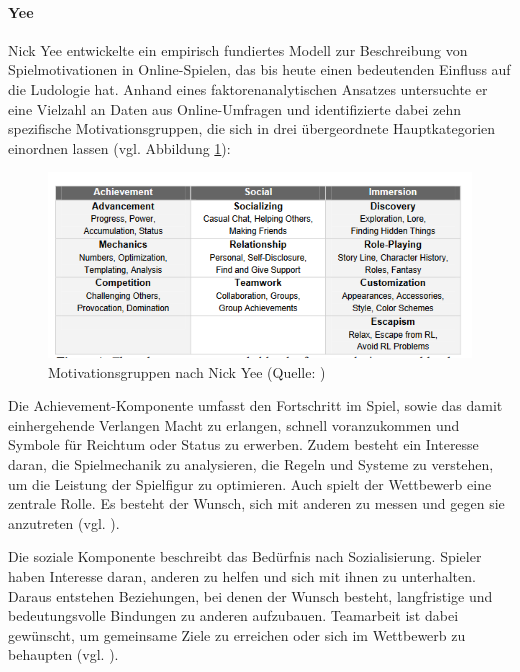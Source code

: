 \paragraph{Yee}
Nick Yee entwickelte ein empirisch fundiertes Modell zur Beschreibung von Spielmotivationen in Online-Spielen, das bis heute einen bedeutenden Einfluss auf die Ludologie hat. Anhand eines faktorenanalytischen Ansatzes untersuchte er eine Vielzahl an Daten aus Online-Umfragen und identifizierte dabei zehn spezifische Motivationsgruppen, die sich in drei übergeordnete Hauptkategorien einordnen lassen (vgl. Abbildung \ref{fig:nick_yee_motivations}):

\begin{figure}[ht]
\centering
\includegraphics[width=1\linewidth]{content/pictures/nick_yee_categorizations.PNG}
\caption{Motivationsgruppen nach Nick Yee (Quelle: \citealp[S. 5]{nick_yee_motivations_2006})}
\label{fig:nick_yee_motivations}
\end{figure}

Die Achievement-Komponente umfasst den Fortschritt im Spiel, sowie das damit einhergehende Verlangen Macht zu erlangen, schnell voranzukommen und Symbole für Reichtum oder Status zu erwerben. Zudem besteht ein Interesse daran, die Spielmechanik zu analysieren, die Regeln und Systeme zu verstehen, um die Leistung der Spielfigur zu optimieren. Auch spielt der Wettbewerb eine zentrale Rolle. Es besteht der Wunsch, sich mit anderen zu messen und gegen sie anzutreten (vgl. \citealp[S. 5]{nick_yee_motivations_2006}).

Die soziale Komponente beschreibt das Bedürfnis nach Sozialisierung. Spieler haben Interesse daran, anderen zu helfen und sich mit ihnen zu unterhalten. Daraus entstehen Beziehungen, bei denen der Wunsch besteht, langfristige und bedeutungsvolle Bindungen zu anderen aufzubauen. Teamarbeit ist dabei gewünscht, um gemeinsame Ziele zu erreichen oder sich im Wettbewerb zu behaupten (vgl. \citealp[S. 6]{nick_yee_motivations_2006}).

